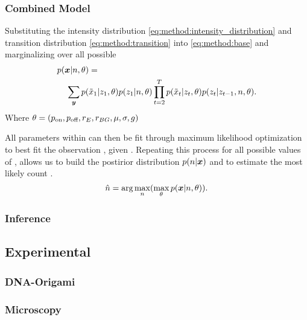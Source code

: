 \subsubsection{Combined Model}



Substituting the intensity distribution \eqref{eq:method:intensity_distribution} 
and transition distribution \eqref{eq:method:transition} 
into \eqref{eq:method:base} and marginalizing over all possible \states
% 
\begin{align}
  \label{eq:method:likelihood}
  p(\bm{x}|n,\theta) &=\\
    \sum_{\bm{y}}
      p(&\tilde{x}_{1}|z_{1}, \theta)
      p(z_{1}|n, \theta)
      \prod_{t=2}^{T}
        p(\tilde{x}_{t}|z_{t}, \theta)
        p(z_{t}|z_{t-1},n, \theta)
    \notag
  \text{.}
\end{align}
%
Where $\theta = (p_\text{on}, p_\text{off}, r_{E}, r_{BG}, \mu, \sigma, g)$

All parameters within \parameters can then be fit through 
maximum likelihood optimization to best fit the observation \trace, given \n. 
%
Repeating this process for all possible values of \n, allows us to build 
the postirior distribution $p(n | \bm{x})$ and to estimate 
the most likely count \estimatedn.
%
\begin{equation}
    \hat{n} =
    \text{arg}\max_{n}(
    \max_\theta
    p(\bm{x}|n,\theta))
  \text{.}
  \label{eq:method:optimization}
\end{equation}

\subsubsection{Inference}



\subsection{Experimental}
\subsubsection{DNA-Origami}


\subsubsection{Microscopy}


